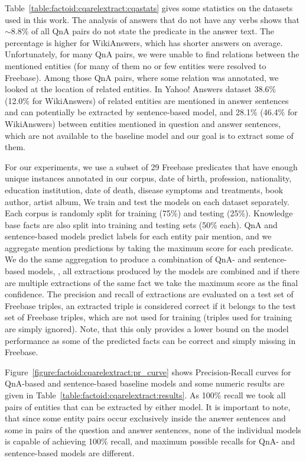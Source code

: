 Table~\ref{table:factoid:cqarelextract:cqastats} gives some statistics on the datasets used in this work.
The analysis of answers that do not have any verbs shows that $\sim$8.8\% of all QnA pairs do not state the predicate in the answer text.
The percentage is higher for WikiAnswers, which has shorter answers on average.
Unfortunately, for many QnA pairs, we were unable to find relations between the mentioned entities (for many of them no or few entities were resolved to Freebase).
Among those QnA pairs, where some relation was annotated, we looked at the location of related entities.
In Yahoo! Answers dataset 38.6\% (12.0\% for WikiAnswers) of related entities are mentioned in answer sentences and can potentially be extracted by sentence-based model, and 28.1\% (46.4\% for WikiAnswers) between entities mentioned in question and answer sentences, which are not available to the baseline model and our goal is to extract some of them.

For our experiments, we use a subset of 29 Freebase predicates that have enough unique instances annotated in our corpus, \eg date of birth, profession, nationality, education institution, date of death, disease symptoms and treatments, book author, artist album, \etc
We train and test the models on each dataset separately.
Each corpus is randomly split for training (75\%) and testing (25\%).
Knowledge base facts are also split into training and testing sets (50\% each).
QnA and sentence-based models predict labels for each entity pair mention, and we aggregate mention predictions by taking the maximum score for each predicate.
We do the same aggregation to produce a combination of QnA- and sentence-based models, \ie, all extractions produced by the models are combined and if there are multiple extractions of the same fact we take the maximum score as the final confidence.
The precision and recall of extractions are evaluated on a test set of Freebase triples, \ie an extracted triple is considered correct if it belongs to the test set of Freebase triples, which are not used for training (triples used for training are simply ignored).
Note, that this only provides a lower bound on the model performance as some of the predicted facts can be correct and simply missing in Freebase.

Figure~\ref{figure:factoid:cqarelextract:pr_curve} shows Precision-Recall curves for QnA-based and sentence-based baseline models and some numeric results are given in Table~\ref{table:factoid:cqarelextract:results}.
As 100\% recall we took all pairs of entities that can be extracted by either model.
It is important to note, that since some entity pairs occur exclusively inside the answer sentences and some in pairs of the question and answer sentences, none of the individual models is capable of achieving 100\% recall, and maximum possible recalls for QnA- and sentence-based models are different.

